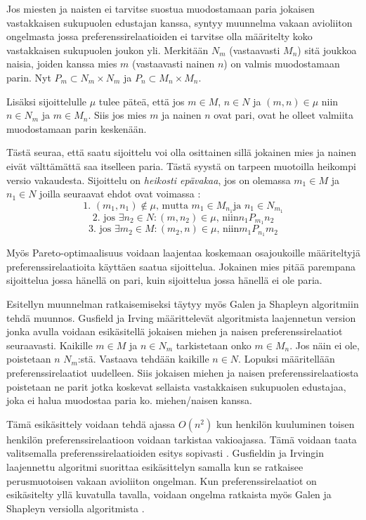 \documentclass[gradu, twoside]{tktltiki}
\begin{document}
Jos miesten ja naisten ei tarvitse suostua muodostamaan paria jokaisen
vastakkaisen sukupuolen edustajan kanssa, syntyy muunnelma vakaan
avioliiton ongelmasta jossa preferenssirelaatioiden ei tarvitse olla
määritelty koko vastakkaisen sukupuolen joukon yli. Merkitään $N_m$
(vastaavasti $M_n$) sitä joukkoa naisia, joiden kanssa mies $m$
(vastaavasti nainen $n$) on valmis muodostamaan parin. Nyt $P_m
\subset N_m \times N_m$ ja $P_n \subset M_n \times M_n$.

 Lisäksi sijoittelulle $\mu$ tulee päteä, että jos $m \in M$, $n \in
 N$ ja $(m, n) \in \mu$ niin $n \in N_m$ ja $m \in M_n$. Siis jos mies
 $m$ ja nainen $n$ ovat pari, ovat he olleet valmiita muodostamaan
 parin keskenään.

Tästä seuraa, että saatu sijoittelu voi olla osittainen sillä jokainen
mies ja nainen eivät välttämättä saa itselleen paria. Tästä syystä on
tarpeen muotoilla heikompi versio vakaudesta. Sijoittelu on
\emph{heikosti epävakaa}, jos on olemassa $m_1 \in M$ ja $n_1 \in N$
joilla seuraavat ehdot ovat voimassa \cite[sivu 27]{gusfield89}:
\[
\text{1. }(m_1, n_1) \notin \mu \text{, mutta } m_1 \in M_{n_1} \text{
  ja } n_1 \in N_{m_1}
\]
\[
\text{2. jos }\exists n_2 \in N: (m, n_2) \in \mu \text{, niin
}n_1P_{m_1}n_2
\]
\[
\text{3. jos }\exists m_2 \in M: (m_2, n) \in \mu \text{, niin
}m_1P_{n_1}m_2
\]

Myös Pareto-optimaalisuus voidaan laajentaa koskemaan osajoukoille
määriteltyjä preferenssirelaatioita käyttäen saatua sijoittelua.
Jokainen mies pitää parempana sijoittelua jossa hänellä on pari, kuin
sijoittelua jossa hänellä ei ole paria. \cite[sivu 27]{gusfield89}

Esitellyn muunnelman ratkaisemiseksi täytyy myös Galen ja Shapleyn
algoritmiin tehdä muunnos. Gusfield ja Irving määrittelevät
algoritmista laajennetun version \cite[sivu 16]{gusfield89} jonka
avulla voidaan esikäsitellä jokaisen miehen ja naisen
preferenssirelaatiot seuraavasti. Kaikille $m \in M$ ja $n \in N_m$
tarkistetaan onko $m \in M_{n}$. Jos näin ei ole, poistetaan $n$
$N_m$:stä. Vastaava tehdään kaikille $n \in N$. Lopuksi määritellään
preferenssirelaatiot uudelleen. Siis jokaisen miehen ja naisen
preferenssirelaatiosta poistetaan ne parit jotka koskevat sellaista
vastakkaisen sukupuolen edustajaa, joka ei halua muodostaa paria ko.
miehen\slash naisen kanssa.

Tämä esikäsittely voidaan tehdä ajassa $O(n^2)$ kun henkilön
kuuluminen toisen henkilön preferenssirelaatioon voidaan tarkistaa
vakioajassa. Tämä voidaan taata valitsemalla preferenssirelaatioiden
esitys sopivasti \cite[sivu 14]{gusfield89}. Gusfieldin ja Irvingin
laajennettu algoritmi suorittaa esikäsittelyn samalla kun se ratkaisee
perusmuotoisen vakaan avioliiton ongelman. Kun preferenssirelaatiot on
esikäsitelty yllä kuvatulla tavalla, voidaan ongelma ratkaista myös
Galen ja Shapleyn versiolla algoritmista \cite[sivu 28]{gusfield89}.
\end{document}
